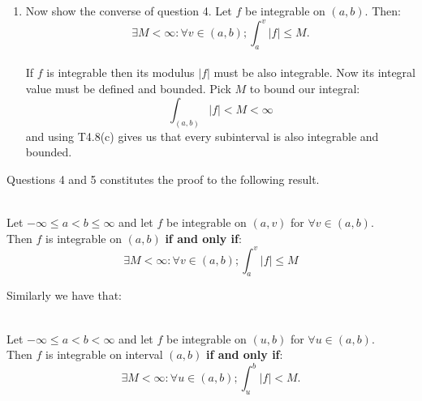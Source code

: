 \begin{enumerate}
    \newpage

    \item Now show the converse of question 4.
    Let $f$ be integrable on $(a,b)$. Then:
    $$\exists M<\infty:\forall v\in(a,b);
    \int_{a}^{v}|f|\leq M.$$ \\

    If $f$ is integrable
    then its modulus $|f|$ must be also integrable.
    Now its integral value must be defined and bounded.
    Pick $M$ to bound our integral:
    $$\int_{(a,b)}|f|<M<\infty$$
    and using T4.8(c) gives us that every subinterval is also
    integrable and bounded. \\
\end{enumerate}

Questions 4 and 5 constitutes the proof to the following result.
\begin{theorem}
    \hfill \\
    Let $-\infty\leq a<b\leq\infty$ and let
    $f$ be integrable on $(a,v)$ for $\forall v\in(a,b)$. \\
    Then $f$ is integrable on $(a,b)$ \textbf{if and only if}:
    $$\exists M<\infty:\forall v\in(a,b);
    \int_{a}^{v}|f|\leq M$$
\end{theorem}

Similarly we have that:
\begin{theorem}
    \hfill \\
    Let $-\infty\leq a<b<\infty$ and let
    $f$ be integrable on $(u,b)$ for $\forall u\in(a,b)$. \\
    Then $f$ is integrable on interval $(a,b)$ \textbf{if and only if}:
    $$\exists M<\infty:\forall u\in(a,b);\int_{u}^{b}|f|<M.$$
\end{theorem}

\newpage

